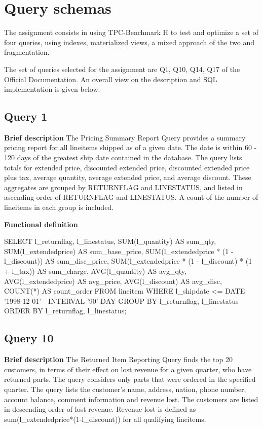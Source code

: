 
\section{Query schemas}

The assignment consists in using TPC-Benchmark H to test and optimize a set of four queries, using indexes, materialized views, a mixed approach of the two and fragmentation.

The set of queries selected for the assignment are Q1, Q10, Q14, Q17 of the Official Documentation. An overall view on the description and SQL implementation is given below.

\subsection{Query 1}
\textbf{Brief description}
The Pricing Summary Report Query provides a summary pricing report for all lineitems shipped as of a given date.
The date is within 60 - 120 days of the greatest ship date contained in the database. The query lists totals for
extended price, discounted extended price, discounted extended price plus tax, average quantity, average extended
price, and average discount. These aggregates are grouped by RETURNFLAG and LINESTATUS, and listed in
ascending order of RETURNFLAG and LINESTATUS. A count of the number of lineitems in each group is
included.

\textbf{Functional definition}
\begin{sql}
SELECT
    l_returnflag,
    l_linestatus,
    SUM(l_quantity) AS sum_qty,
    SUM(l_extendedprice) AS sum_base_price,
    SUM(l_extendedprice * (1 - l_discount)) AS sum_disc_price,
    SUM(l_extendedprice * (1 - l_discount) * (1 + l_tax)) AS sum_charge,
    AVG(l_quantity) AS avg_qty,
    AVG(l_extendedprice) AS avg_price,
    AVG(l_discount) AS avg_disc,
    COUNT(*) AS count_order
FROM
    lineitem
WHERE
    l_shipdate <= DATE '1998-12-01' - INTERVAL '90' DAY
GROUP BY
    l_returnflag,
    l_linestatus
ORDER BY
    l_returnflag,
    l_linestatus;
\end{sql}

\subsection{Query 10}
\textbf{Brief description}
The Returned Item Reporting Query finds the top 20 customers, in terms of their effect on lost revenue for a given
quarter, who have returned parts. The query considers only parts that were ordered in the specified quarter. The
query lists the customer's name, address, nation, phone number, account balance, comment information and revenue
lost. The customers are listed in descending order of lost revenue. Revenue lost is defined as
sum(l\_extendedprice*(1-l\_discount)) for all qualifying lineitems.

